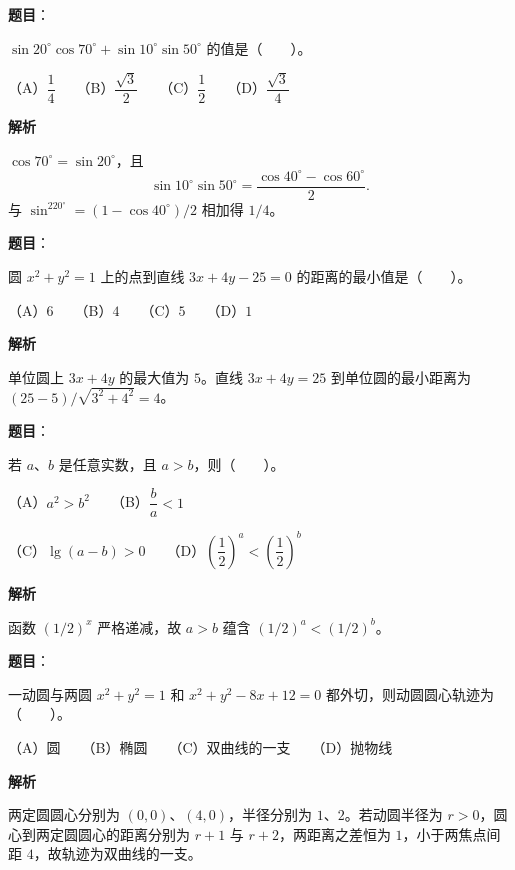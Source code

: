 \begin{answer}

\textbf{题目}：

$\sin20^\circ\cos70^\circ+\sin10^\circ\sin50^\circ$ 的值是\mbox{（　　）}。

（A）$\dfrac14$　　（B）$\dfrac{\sqrt3}{2}$　　（C）$\dfrac12$　　（D）$\dfrac{\sqrt3}{4}$

\textbf{解析}

$\cos70^\circ=\sin20^\circ$，且
\nopagebreak[4]
\[
\sin10^\circ\sin50^\circ=\frac{\cos40^\circ-\cos60^\circ}{2}.
\]
与 $\sin^220^\circ=(1-\cos40^\circ)/2$ 相加得 $1/4$。


\end{answer}
\begin{answer}

\textbf{题目}：

圆 $x^2+y^2=1$ 上的点到直线 $3x+4y-25=0$ 的距离的最小值是\mbox{（　　）}。

（A）$6$　　（B）$4$　　（C）$5$　　（D）$1$

\textbf{解析}

单位圆上 $3x+4y$ 的最大值为 $5$。直线 $3x+4y=25$ 到单位圆的最小距离为 $(25-5)/\sqrt{3^2+4^2}=4$。


\end{answer}
\begin{answer}

\textbf{题目}：

若 $a\text{、}b$ 是任意实数，且 $a>b$，则\mbox{（　　）}。

（A）$a^2>b^2$　　（B）$\dfrac ba<1$

（C）$\lg(a-b)>0$　　（D）$\left(\dfrac12\right)^a<\left(\dfrac12\right)^b$

\textbf{解析}

函数 $(1/2)^x$ 严格递减，故 $a>b$ 蕴含 $(1/2)^a<(1/2)^b$。


\end{answer}
\begin{answer}

\textbf{题目}：

一动圆与两圆 $x^2+y^2=1$ 和 $x^2+y^2-8x+12=0$ 都外切，则动圆圆心轨迹为\mbox{（　　）}。

（A）圆　　（B）椭圆　　（C）双曲线的一支　　（D）抛物线

\textbf{解析}

两定圆圆心分别为 $(0,0)$、$(4,0)$，半径分别为 $1$、$2$。若动圆半径为 $r>0$，圆心到两定圆圆心的距离分别为 $r+1$ 与 $r+2$，两距离之差恒为 $1$，小于两焦点间距 $4$，故轨迹为双曲线的一支。


\end{answer}
